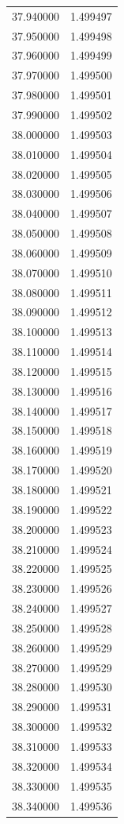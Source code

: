 \begin{tabular}{rr}
37.940000 & 1.499497 \\
37.950000 & 1.499498 \\
37.960000 & 1.499499 \\
37.970000 & 1.499500 \\
37.980000 & 1.499501 \\
37.990000 & 1.499502 \\
38.000000 & 1.499503 \\
38.010000 & 1.499504 \\
38.020000 & 1.499505 \\
38.030000 & 1.499506 \\
38.040000 & 1.499507 \\
38.050000 & 1.499508 \\
38.060000 & 1.499509 \\
38.070000 & 1.499510 \\
38.080000 & 1.499511 \\
38.090000 & 1.499512 \\
38.100000 & 1.499513 \\
38.110000 & 1.499514 \\
38.120000 & 1.499515 \\
38.130000 & 1.499516 \\
38.140000 & 1.499517 \\
38.150000 & 1.499518 \\
38.160000 & 1.499519 \\
38.170000 & 1.499520 \\
38.180000 & 1.499521 \\
38.190000 & 1.499522 \\
38.200000 & 1.499523 \\
38.210000 & 1.499524 \\
38.220000 & 1.499525 \\
38.230000 & 1.499526 \\
38.240000 & 1.499527 \\
38.250000 & 1.499528 \\
38.260000 & 1.499529 \\
38.270000 & 1.499529 \\
38.280000 & 1.499530 \\
38.290000 & 1.499531 \\
38.300000 & 1.499532 \\
38.310000 & 1.499533 \\
38.320000 & 1.499534 \\
38.330000 & 1.499535 \\
38.340000 & 1.499536 \\

\end{tabular}
